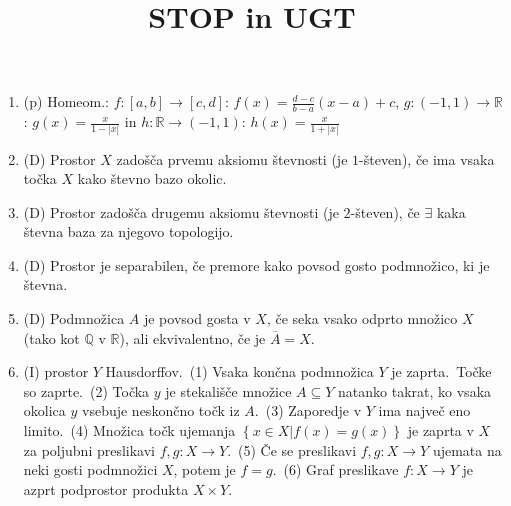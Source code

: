\documentclass[10pt,a4paper]{article}
\title{STOP in UGT}
\author{}
\date{}
\begin{document}

\begin{enumerate} 
    \setlength\itemsep{-1px}%

\item (p) Homeom.: $f: [a,b]\to[c,d]$: $f(x)=\frac{d-c}{b-a}(x-a)+c$,
$g: (-1,1)\to\mathbb{R}$: $g(x)=\frac{x}{1-|x|}$ in 
$h: \mathbb{R}\to(-1,1)$: $h(x)=\frac{x}{1+|x|}$
            
\item (D) Prostor $X$ zadošča prvemu aksiomu števnosti (je $1$-števen), če ima vsaka točka $X$ kako števno bazo okolic.
            
\item (D) Prostor zadošča drugemu aksiomu števnosti (je $2$-števen), če $\exists$ kaka števna baza za njegovo topologijo.
            
\item (D) Prostor je separabilen, če premore kako povsod gosto podmnožico, ki je števna.
\item (D) Podmnožica $A$ je povsod gosta v $X$, če seka vsako odprto množico $X$ (tako kot $\mathbb{Q}$ v $\mathbb{R}$), ali ekvivalentno, če je $\overline{A}=X$.


\item (I)  prostor $Y$ Hausdorffov.~(1) Vsaka končna podmnožica $Y$ je zaprta.~Točke so zaprte.~(2) Točka $y$ je stekališče množice $A\subseteq Y$ natanko takrat, ko vsaka okolica $y$ vsebuje neskončno točk iz $A$.~(3) Zaporedje v $Y$ ima največ eno limito.~(4) Množica točk ujemanja $\left\{x\in X | f(x)=g(x)\right\}$ je zaprta v $X$ za poljubni preslikavi $f,g: X\to Y$.~(5) Če se preslikavi $f,g: X\to Y$ ujemata na neki gosti podmnožici $X$, potem je $f=g$.~(6) Graf preslikave $f: X\to Y$ je azprt podprostor produkta $X\times Y$.


\end{enumerate}
\end{document}
